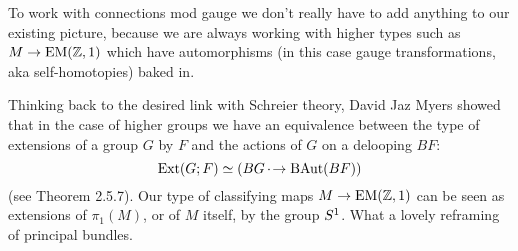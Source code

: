 To work with connections mod gauge we don't really have to add anything to our existing picture, because we are always working with higher types such as \( M\to\mathrm{EM}(\mathbb{Z},1) \) which have automorphisms (in this case gauge transformations, aka self-homotopies) baked in.

Thinking back to the desired link with Schreier theory, David Jaz Myers showed that in the case of higher groups we have an equivalence between the type of extensions of a group \( G \) by \( F \) and the actions of \( G \) on a delooping \( BF \):
\[ 
\mathrm{Ext}(G; F) \simeq (BG \,\cdot\!\to \operatorname{BAut}(BF))
\]
(see \cite{myersthesis} Theorem 2.5.7). Our type of classifying maps \( M\to\mathrm{EM}(\mathbb{Z},1) \) can be seen as extensions of \( \pi_1(M) \), or of \( M \) itself, by the group \( S^1 \). What a lovely reframing of principal bundles.

